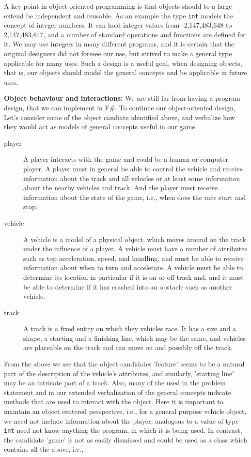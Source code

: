 A key point in object-oriented programming is that objects should to a large extend be independent and reusable. As an example the type \lstinline|int| models the concept of integer numbers. It can hold integer values from -2,147,483,648 to 2,147,483,647, and a number of standard operations and functions are defined for it. We may use integers in many different programs, and it is certain that the original designers did not foresee our use, but strived to make a general type applicable for many uses. Such a design is a useful goal, when designing objects, that is, our objects should model the general concepts and be applicable in future uses.

\textbf{Object behaviour and interactions:} We are still far from having a program design, that we can implement in F\#. To continue our object-oriented design, Let's consider some of the object candiate identified above, and verbalize how they would act as models of general concepts useful in our game.
\begin{description}
\item[player] A player interacts with the game and could be a human or computer player. A player must in general be able to control the vehicle and receive information about the track and all vehicles or at least some information about the nearby vehicles and track. And the player must receive information about the state of the game, i.e., when does the race start and stop.
\item[vehicle] A vehicle is a model of a physical object, which moves around on the track under the influence of a player. A vehicle must have a number of attributes such as top acceleration, speed, and handling, and must be able to receive information about when to turn and accelerate. A vehicle must be able to determine its location in particular if it is on or off track and, and it must be able to determine if it has crashed into an obstacle such as another vehicle.
\item[track] A track is a fixed entity on which they vehicles race. It has a size and a shape, a starting and a finishing line, which may be the same, and vehicles are placeable on the track and can move on and possibly off the track.
\end{description}
From the above we see that the object candidates 'feature' seems to be a natural part of the description of the vehicle's attributes, and similarly, 'starting line' may be an intricate part of a track. Also, many of the  used in the problem statement and in our extended verbalisation of the general concepts indicate methods that are used to interact with the object. Here it is important to maintain an object centered perspective, i.e., for a general purpose vehicle object, we need not include information about the player, analogous to a value of type \lstinline|int| need not know anything the program, in which it is being used. In contrast, the candidate 'game' is not as easily dismissed and could be used as a class which contains all the above, i.e.,
